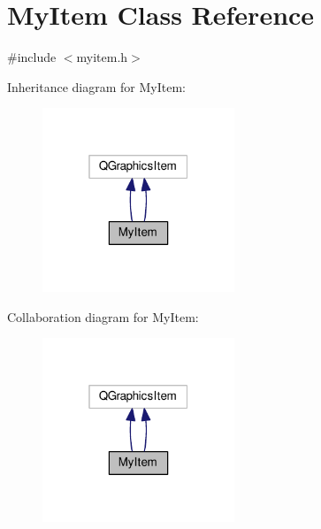 \hypertarget{class_my_item}{}\section{My\+Item Class Reference}
\label{class_my_item}


{\ttfamily \#include $<$myitem.\+h$>$}



Inheritance diagram for My\+Item\+:\nopagebreak
\begin{figure}[H]
\begin{center}
\leavevmode
\includegraphics[width=163pt]{class_my_item__inherit__graph}
\end{center}
\end{figure}


Collaboration diagram for My\+Item\+:\nopagebreak
\begin{figure}[H]
\begin{center}
\leavevmode
\includegraphics[width=163pt]{class_my_item__coll__graph}
\end{center}
\end{figure}
